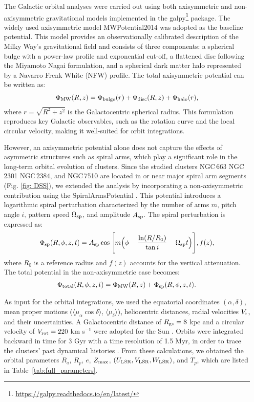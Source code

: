 \documentclass[referee]{raa}            %
\begin{document}
The Galactic orbital analyses were carried out using both axisymmetric and non-axisymmetric gravitational models implemented in the {\sc galpy}\footnote{\url{https://galpy.readthedocs.io/en/latest/}} package. The widely used axisymmetric model {\sc MWPotential2014} \citep{Bovy2015} was adopted as the baseline potential. This model provides an observationally calibrated description of the Milky Way’s gravitational field and consists of three components: a spherical bulge with a power-law profile and exponential cut-off, a flattened disc following the Miyamoto Nagai formulation, and a spherical dark matter halo represented by a Navarro Frenk White (NFW) profile. The total axisymmetric potential can be written as:
\begin{equation}
\Phi_{\rm MW}(R,z) = \Phi_{\rm bulge}(r) + \Phi_{\rm disc}(R,z) + \Phi_{\rm halo}(r),
\end{equation}
where $r=\sqrt{R^2+z^2}$ is the Galactocentric spherical radius. This formulation reproduces key Galactic observables, such as the rotation curve and the local circular velocity, making it well-suited for orbit integrations.

However, an axisymmetric potential alone does not capture the effects of asymmetric structures such as spiral arms, which play a significant role in the long-term orbital evolution of clusters. Since the studied clusters NGC\,663 NGC\,2301 NGC\,2384, and NGC\,7510 are located in or near major spiral arm segments (Fig. \ref{fig: DSS}), we extended the analysis by incorporating a non-axisymmetric contribution using the {\sc SpiralArmsPotential} \citep{Bovy2015}. This potential introduces a logarithmic spiral perturbation characterized by the number of arms $m$, pitch angle $i$, pattern speed $\Omega_{\rm sp}$, and amplitude $A_{\rm sp}$. The spiral perturbation is expressed as:
\begin{equation}
\Phi_{\rm sp}(R,\phi,z,t) = A_{\rm sp} \cos \Bigg[ m \Big( \phi - \frac{\ln(R/R_0)}{\tan i} - \Omega_{\rm sp} t \Big) \Bigg] , f(z),
\end{equation}
where $R_0$ is a reference radius and $f(z)$ accounts for the vertical attenuation. The total potential in the non-axisymmetric case becomes:
\begin{equation}
\Phi_{\rm total}(R,\phi,z,t) = \Phi_{\rm MW}(R,z) + \Phi_{\rm sp}(R,\phi,z,t).
\end{equation}

As input for the orbital integrations, we used the equatorial coordinates $(\alpha,\delta)$, mean proper motions ($\langle \mu_{\alpha}\cos\delta \rangle$, $\langle \mu_\delta \rangle$), heliocentric distances, radial velocities $V_{\rm r}$, and their uncertainties. A Galactocentric distance of $R_{\rm gc}=8$ kpc and a circular velocity of $V_{\rm rot}=220$ km s$^{-1}$ were adopted for the Sun \citep{Bovy2015,Bovy2012}. Orbits were integrated backward in time for 3 Gyr with a time resolution of 1.5 Myr, in order to trace the clusters’ past dynamical histories \citep{Cinar_2025, Canbay_2025, Alzahrani2025a, Tasdemir2025b}. From these calculations, we obtained the orbital parameters $R_a$, $R_p$, $e$, $Z_{\rm max}$, $(U_{\rm LSR},V_{\rm LSR},W_{\rm LSR})$, and $T_p$, which are listed in Table~\ref{tab:full_parameters}.
\end{document}
